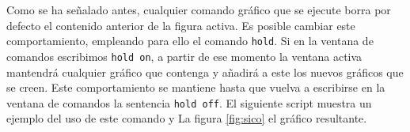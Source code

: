 












Como se ha señalado antes, cualquier comando gráfico que se ejecute borra por defecto el contenido anterior de la figura activa. Es posible cambiar este comportamiento, empleando para ello el comando \texttt{hold}. Si en la ventana de comandos escribimos \texttt{hold on}, a partir de ese momento la ventana activa mantendrá cualquier gráfico que contenga y añadirá a este los nuevos gráficos que se creen. Este comportamiento se mantiene hasta que vuelva a escribirse en la ventana de comandos la sentencia \texttt{hold off}. El siguiente script muestra un ejemplo del uso de este comando y La figura \ref{fig:sico} el gráfico resultante.




